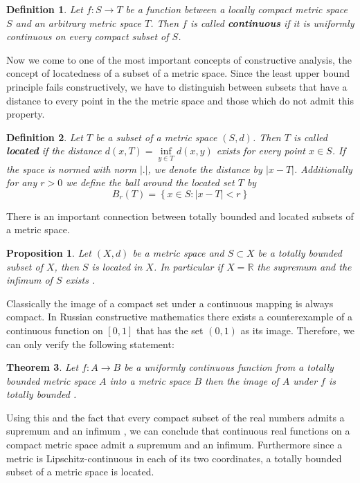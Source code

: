 \documentclass[11pt,a4paper,leqno]{report}
\newtheorem{theorem}{Theorem}[chapter]
\newtheorem{proposition}{Proposition}[chapter]
\newtheorem{definition}[theorem]{Definition}
\numberwithin{equation}{chapter}
\begin{document}
\begin{definition} Let $f:S\rightarrow T$ be a function between a locally compact metric space $S$ and an arbitrary metric space $T$. Then $f$ is called \textbf{continuous} if it is uniformly continuous on every compact subset of $S$.\end{definition}
Now we come to one of the most important concepts of constructive analysis, the concept of locatedness of a subset of a metric space. Since the least upper bound principle fails constructively, we have to distinguish between subsets that have a distance to every point in the the metric space and those which do not admit this property.
\begin{definition} Let $T$ be a subset of a metric space $(S,d)$. Then $T$ is called \textbf{located} if the distance $d(x,T)=\underset{y\in T}{\inf}d(x,y)$ exists for every point $x\in S$. If the space is normed with norm $|.|$, we denote the distance by $|x-T|$. Additionally for any $r>0$ we define the ball around the located set $T$ by
\begin{equation*}B_r(T)=\left\{x\in S: |x-T|<r\right\}\end{equation*}\end{definition}
There is an important connection between totally bounded and located subsets of a metric space.
\begin{proposition} Let $(X,d)$ be a metric space and $S\subset X$ be a totally bounded subset of $X$, then $S$ is located in $X$. In particular if $X=\mathbb{R}$ the supremum and the infimum of $S$ exists \cite{CANA}.\end{proposition}
Classically the image of a compact set under a continuous mapping is always compact. In Russian constructive mathematics there exists a counterexample of a continuous function on $[0,1]$ that has the set $(0,1)$ as its image. Therefore, we can only verify the following statement:
\begin{theorem} Let $f:A\rightarrow B$ be a uniformly continuous function from a totally bounded metric space $A$ into a metric space $B$ then the image of $A$ under $f$ is totally bounded \cite{CANA}.
\end{theorem}
Using this and the fact that every compact subset of the real numbers admits a supremum and an infimum \cite[Corollary 4.4 p.38]{CANA}, we can conclude that continuous real functions on a compact metric space admit a supremum and an infimum. Furthermore since a metric is Lipschitz-continuous in each of its two coordinates, a totally bounded subset of a metric space is located.\\
\end{document}
